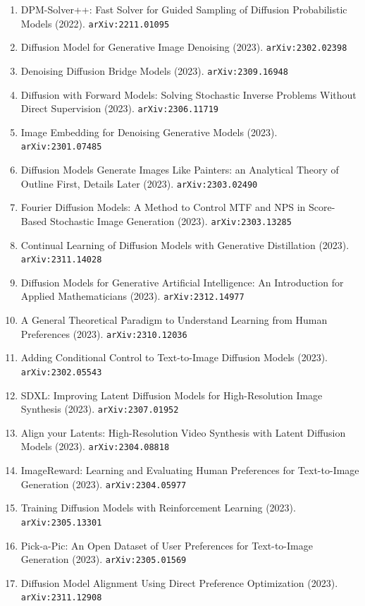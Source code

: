 \documentclass[11pt]{article}
\begin{document}
\begin{enumerate}
  \item DPM-Solver++: Fast Solver for Guided Sampling of Diffusion Probabilistic Models (2022). \texttt{arXiv:2211.01095}
  \item Diffusion Model for Generative Image Denoising (2023). \texttt{arXiv:2302.02398}
  \item Denoising Diffusion Bridge Models (2023). \texttt{arXiv:2309.16948}
  \item Diffusion with Forward Models: Solving Stochastic Inverse Problems
  Without Direct Supervision (2023). \texttt{arXiv:2306.11719}
  \item Image Embedding for Denoising Generative Models (2023). \texttt{arXiv:2301.07485}
  \item Diffusion Models Generate Images Like Painters: an Analytical Theory of
  Outline First, Details Later (2023). \texttt{arXiv:2303.02490}
  \item Fourier Diffusion Models: A Method to Control MTF and NPS in Score-Based
  Stochastic Image Generation (2023). \texttt{arXiv:2303.13285}
  \item Continual Learning of Diffusion Models with Generative Distillation (2023). \texttt{arXiv:2311.14028}
  \item Diffusion Models for Generative Artificial Intelligence: An Introduction
  for Applied Mathematicians (2023). \texttt{arXiv:2312.14977}
  \item A General Theoretical Paradigm to Understand Learning from Human
  Preferences (2023). \texttt{arXiv:2310.12036}
  \item Adding Conditional Control to Text-to-Image Diffusion Models (2023). \texttt{arXiv:2302.05543}
  \item SDXL: Improving Latent Diffusion Models for High-Resolution Image
  Synthesis (2023). \texttt{arXiv:2307.01952}
  \item Align your Latents: High-Resolution Video Synthesis with Latent
  Diffusion Models (2023). \texttt{arXiv:2304.08818}
  \item ImageReward: Learning and Evaluating Human Preferences for Text-to-Image
  Generation (2023). \texttt{arXiv:2304.05977}
  \item Training Diffusion Models with Reinforcement Learning (2023). \texttt{arXiv:2305.13301}
  \item Pick-a-Pic: An Open Dataset of User Preferences for Text-to-Image
  Generation (2023). \texttt{arXiv:2305.01569}
  \item Diffusion Model Alignment Using Direct Preference Optimization (2023). \texttt{arXiv:2311.12908}

\end{enumerate}
\end{document}
